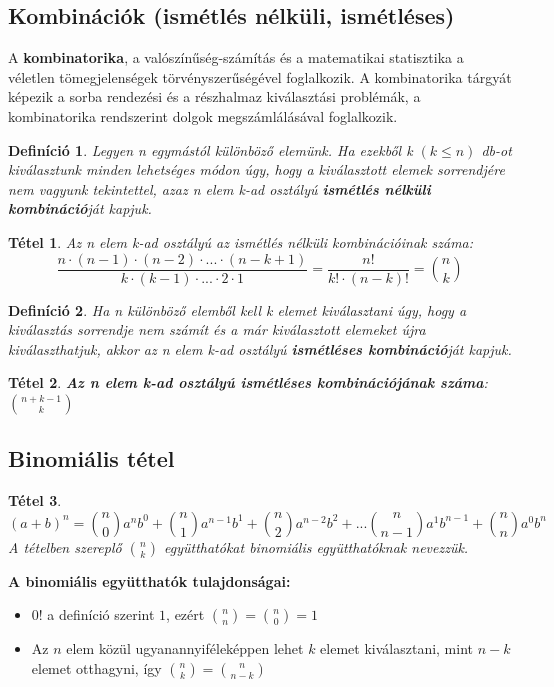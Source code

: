 \documentclass[12pt,a4paper]{article}
\newtheorem{theorem}{Tétel} [section]
\newtheorem{definition}{Definíció} [section]
\begin{document}
\subsection{Kombinációk (ismétlés nélküli, ismétléses)}
A \textbf{kombinatorika}, a valószínűség-számítás és a matematikai statisztika a véletlen tömegjelenségek törvényszerűségével foglalkozik. A kombinatorika tárgyát képezik a sorba rendezési és a részhalmaz kiválasztási problémák, a kombinatorika rendszerint dolgok megszámlálásával foglalkozik.
\begin{definition}
Legyen n egymástól különböző elemünk. Ha ezekből k $(k \leq n)$ db-ot kiválasztunk minden lehetséges módon úgy, hogy a kiválasztott elemek sorrendjére nem vagyunk tekintettel, azaz n elem k-ad osztályú \textbf{ismétlés nélküli kombináció}ját kapjuk.
\end{definition}
\begin{theorem}
Az n elem k-ad osztályú az ismétlés nélküli kombinációinak száma:
$$\dfrac{n\cdot (n-1) \cdot (n-2) \cdot ... \cdot (n-k+1)}{k\cdot (k-1)\cdot ... \cdot 2\cdot 1}=\dfrac{n!}{k!\cdot (n-k)!}=\binom{n}{k}$$
\end{theorem}
\begin{definition}
 Ha n különböző elemből kell k elemet kiválasztani úgy, hogy a kiválasztás sorrendje nem számít és a már kiválasztott elemeket újra kiválaszthatjuk, akkor az n elem k-ad osztályú \textbf{ismétléses kombináció}ját kapjuk.
\end{definition}
\begin{theorem}
\textbf{Az n elem k-ad osztályú ismétléses kombinációjának száma}: $\displaystyle\binom{n+k-1}{k}$
\end{theorem}
\subsection{Binomiális tétel}
\begin{theorem}
\[(a+b)^n=\binom{n}{0}a^{n}b^{0}+\binom{n}{1}a^{n-1}b^{1}+\binom{n}{2}a^{n-2}b^{2}+...\binom{n}{n-1}a^{1}b^{n-1}+\binom{n}{n}a^{0}b^{n}\]
A tételben szereplő $\displaystyle\binom{n}{k}$ együtthatókat binomiális együtthatóknak nevezzük.
\end{theorem}

\textbf{A binomiális együtthatók tulajdonságai:}
\begin{itemize}
\item $0!$ a definíció szerint $1$, ezért $\displaystyle\binom{n}{n}=\displaystyle\binom{n}{0}=1$
\item Az $n$ elem közül ugyanannyiféleképpen lehet $k$ elemet kiválasztani, mint $n - k$ elemet otthagyni, így $\displaystyle\binom{n}{k}=\displaystyle\binom{n}{n-k}$
\end{itemize}
\end{document}
